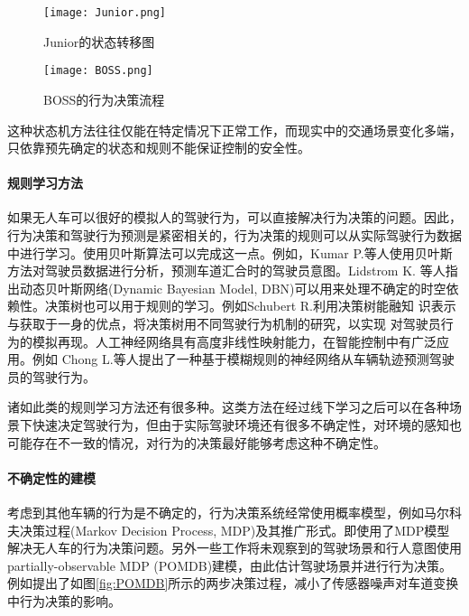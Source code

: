      \begin{figure}[htbp]
      \centering
      \texttt{[image: Junior.png]}
      \caption{Junior的状态转移图\cite{Montemerlo2008Junior}}
      \label{fig:junior}
      \end{figure}

      \begin{figure}[htbp]
      \centering
      \texttt{[image: BOSS.png]}
      \caption{BOSS的行为决策流程\cite{Baker2008Traffic}}
      \label{fig:boss}
      \end{figure}

      这种状态机方法往往仅能在特定情况下正常工作，而现实中的交通场景变化多端，只依靠预先确定的状态和规则不能保证控制的安全性。

      \paragraph{规则学习方法}
      如果无人车可以很好的模拟人的驾驶行为，可以直接解决行为决策的问题。因此，行为决策和驾驶行为预测是紧密相关的，行为决策的规则可以从实际驾驶行为数据中进行学习。使用贝叶斯算法可以完成这一点。例如，Kumar P.等人\cite{Kumar2013Learning}使用贝叶斯方法对驾驶员数据进行分析，预测车道汇合时的驾驶员意图。Lidstrom K. 等人\cite{Lidstrom2008Model}指出动态贝叶斯网络(Dynamic Bayesian Model, DBN)可以用来处理不确定的时空依赖性。决策树也可以用于规则的学习。例如Schubert R.\cite{Schubert2012Evaluating}利用决策树能融知 识表示与获取于一身的优点，将决策树用不同驾驶行为机制的研究，以实现 对驾驶员行为的模拟再现。人工神经网络具有高度非线性映射能力，在智能控制中有广泛应用。例如 Chong L.等人\cite{Chong2013A}提出了一种基于模糊规则的神经网络从车辆轨迹预测驾驶员的驾驶行为。

      诸如此类的规则学习方法还有很多种。这类方法在经过线下学习之后可以在各种场景下快速决定驾驶行为，但由于实际驾驶环境还有很多不确定性，对环境的感知也可能存在不一致的情况，对行为的决策最好能够考虑这种不确定性。

      \paragraph{不确定性的建模}
      考虑到其他车辆的行为是不确定的，行为决策系统经常使用概率模型，例如马尔科夫决策过程(Markov Decision Process, MDP)及其推广形式。\cite{Brechtel2011Probabilistic}即使用了MDP模型解决无人车的行为决策问题。另外一些工作将未观察到的驾驶场景和行人意图使用 partially-observable MDP (POMDB)建模，由此估计驾驶场景并进行行为决策。例如\cite{Ulbrich2013Probabilistic}提出了如图\ref{fig:POMDB}所示的两步决策过程，减小了传感器噪声对车道变换中行为决策的影响。

